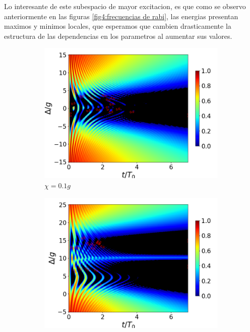 Lo interesante de este subespacio de mayor excitacion, es que como se observo anteriormente en las figuras \ref{fig4:frecuencias de rabi}, las energias presentan maximos y minimos locales, que esperamos que cambien drasticamente la estructura de las dependencias en los parametros al aumentar sus valores. 
\begin{figure}[h]
    \centering
    \begin{subfigure}{0.49\textwidth}
        \includegraphics[width=\textwidth]{figuras/ch4/concu/delta/eg1+ge1 k=0.0g x=0.1g J=0.0g gamma=0.25g concu delta dis.png}
        \caption{$\chi=0.1g$}
        \label{fig4:concu detunning 1 x1}
    \end{subfigure}
    \hfill
    \begin{subfigure}{0.49\textwidth}
        \includegraphics[width=\textwidth]{figuras/ch4/concu/delta/eg1+ge1 k=0.0g x=5.0g J=0.0g gamma=0.25g concu delta dis.png}

\end{subfigure}
\end{figure}
